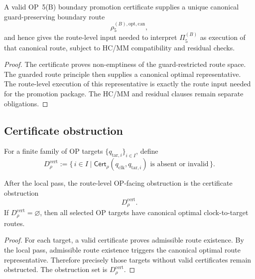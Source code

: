 \begin{proposition}
\label{prop:v410r11-boundary-certificate-triggers-promotion-route}
A valid OP~5(B) boundary promotion certificate supplies a unique canonical
guard-preserving boundary route
\[
 \rho_{5}^{(B),\mathrm{opt,can}},
\]
and hence gives the route-level input needed to interpret
\(\Pi_{5}^{(B)}\) as execution of that canonical route, subject to HC/MM
compatibility and residual checks.
\end{proposition}

\begin{proof}
The certificate proves non-emptiness of the guard-restricted route space. The
guarded route principle then supplies a canonical optimal representative.
The route-level execution of this representative is exactly the route input
needed for the promotion package. The HC/MM and residual clauses remain
separate obligations.
\end{proof}

\subsection{Certificate obstruction}
\label{subsec:v410r11-certificate-obstruction}

\begin{definition}
\label{def:v410r11-certificate-obstruction-set}
For a finite family of OP targets \(\{q_{\mathrm{tar},i}\}_{i\in I}\), define
\[
 D_{\rho}^{\mathrm{cert}}
 :=
 \{\,i\in I\mid
 \mathsf{Cert}_{\rho}(q_{\mathrm{clk}},q_{\mathrm{tar},i})
 \text{ is absent or invalid}\,\}.
\]
\end{definition}

\begin{theorem}
\label{thm:v410r11-op-facing-reduction}
After the local pass, the route-level OP-facing obstruction is the certificate obstruction
\[
 D_{\rho}^{\mathrm{cert}}.
\]
If \(D_{\rho}^{\mathrm{cert}}=\varnothing\), then all selected OP targets have
canonical optimal clock-to-target routes.
\end{theorem}

\begin{proof}
For each target, a valid certificate proves admissible route existence. By the local pass,
admissible route existence triggers the canonical optimal route representative.
Therefore precisely those targets without valid certificates remain obstructed.
The obstruction set is \(D_{\rho}^{\mathrm{cert}}\).
\end{proof}

